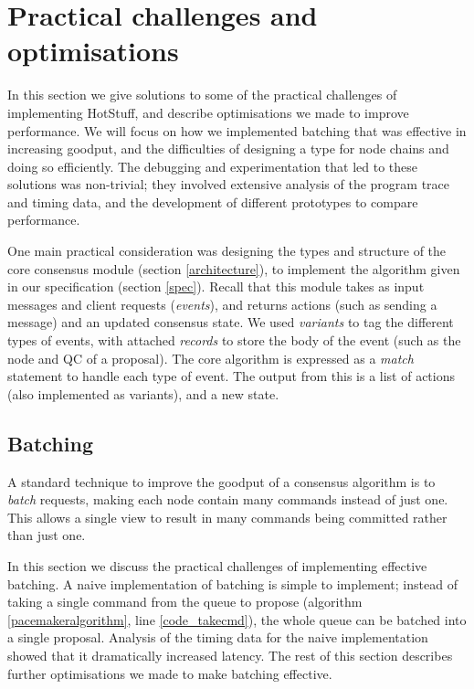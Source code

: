 \section{Practical challenges and optimisations} \label{performance}

In this section we give solutions to some of the practical challenges of implementing HotStuff, and describe optimisations we made to improve performance. We will focus on how we implemented batching that was effective in increasing goodput, and the difficulties of designing a type for node chains and doing so efficiently. The debugging and experimentation that led to these solutions was non-trivial; they involved extensive analysis of the program trace and timing data, and the development of different prototypes to compare performance.

One main practical consideration was designing the types and structure of the core consensus module (section \ref{architecture}), to implement the algorithm given in our specification (section \ref{spec}). Recall that this module takes as input messages and client requests (\textit{events}), and returns actions (such as sending a message) and an updated consensus state. We used \textit{variants} to tag the different types of events, with attached \textit{records} to store the body of the event (such as the node and QC of a proposal). The core algorithm is expressed as a \textit{match} statement to handle each type of event. The output from this is a list of actions (also implemented as variants), and a new state.

\subsection{Batching} \label{batching}
A standard technique to improve the goodput of a consensus algorithm is to \textit{batch} requests, making each node contain many commands instead of just one. This allows a single view to result in many commands being committed rather than just one.

In this section we discuss the practical challenges of implementing effective batching. A naive implementation of batching is simple to implement; instead of taking a single command from the queue to propose (algorithm \ref{pacemakeralgorithm}, line \ref{code_takecmd}), the whole queue can be batched into a single proposal. Analysis of the timing data for the naive implementation showed that it dramatically increased latency. The rest of this section describes further optimisations we made to make batching effective.

